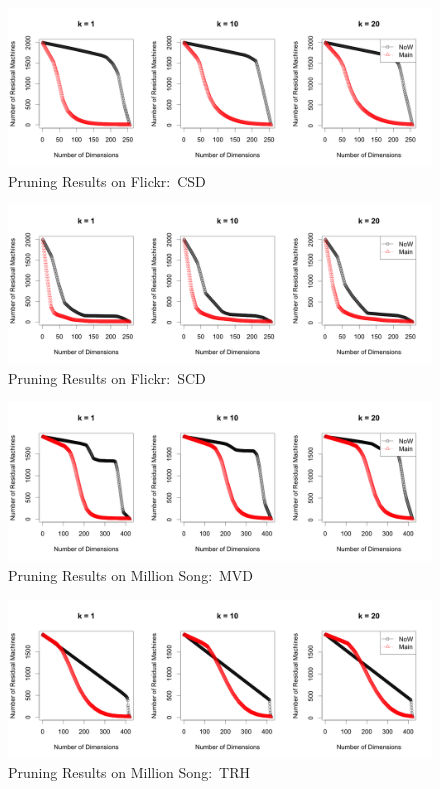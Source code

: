 \begin{figure}[htpb!]
  \centering
  \includegraphics[width=1.0\linewidth]{exp/prune/f2.png}
  \caption{Pruning Results on Flickr:~CSD}
  \label{fig:prune_f2}
\end{figure}

\begin{figure}[htpb!]
  \centering
  \includegraphics[width=1.0\linewidth]{exp/prune/f3.png}
  \caption{Pruning Results on Flickr:~SCD}
  \label{fig:prune_f3}
\end{figure}

\begin{figure}[htpb!]
  \centering
  \includegraphics[width=1.0\linewidth]{exp/prune/mvd.png}
  \caption{Pruning Results on Million Song:~MVD}
  \label{fig:prune_mvd}
\end{figure}

\begin{figure}[htpb!]
  \centering
  \includegraphics[width=1.0\linewidth]{exp/prune/trh.png}
  \caption{Pruning Results on Million Song:~TRH}
  \label{fig:prune_trh}
\end{figure}





%
%